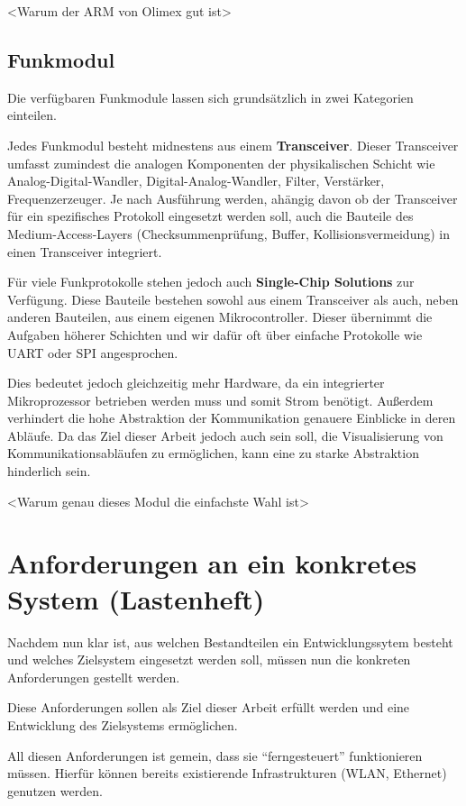 <Warum der ARM von Olimex gut ist>

\subsection{Funkmodul} Die verfügbaren Funkmodule lassen sich grundsätzlich in
zwei Kategorien einteilen.

Jedes Funkmodul besteht midnestens aus einem \textbf{Transceiver}. Dieser
Transceiver umfasst zumindest die analogen Komponenten der physikalischen
Schicht wie Analog-Digital-Wandler, Digital-Analog-Wandler, Filter, Verstärker,
Frequenzerzeuger. Je nach Ausführung werden, ahängig davon ob der Transceiver
für ein spezifisches Protokoll eingesetzt werden soll, auch die Bauteile des
Medium-Access-Layers (Checksummenprüfung, Buffer, Kollisionsvermeidung) in
einen Transceiver integriert.

Für viele Funkprotokolle stehen jedoch auch \textbf{Single-Chip Solutions}
zur Verfügung. Diese Bauteile bestehen sowohl aus einem Transceiver als auch,
neben anderen Bauteilen, aus einem eigenen Mikrocontroller. Dieser übernimmt die
Aufgaben höherer Schichten und wir dafür oft über einfache Protokolle wie UART
oder SPI angesprochen.

Dies bedeutet jedoch gleichzeitig mehr Hardware, da ein integrierter
Mikroprozessor betrieben werden muss und somit Strom benötigt.
Außerdem verhindert die hohe Abstraktion der Kommunikation genauere Einblicke in
deren Abläufe. Da das Ziel dieser Arbeit jedoch auch sein soll, die
Visualisierung von Kommunikationsabläufen zu ermöglichen, kann eine zu starke
Abstraktion hinderlich sein.


 <Warum genau dieses Modul die einfachste Wahl ist>
\section{Anforderungen an ein konkretes System (Lastenheft)}
Nachdem nun klar ist, aus welchen Bestandteilen ein Entwicklungssytem besteht
und welches Zielsystem eingesetzt werden soll, müssen nun die
konkreten Anforderungen gestellt werden.

Diese Anforderungen sollen als Ziel dieser Arbeit erfüllt werden und eine
Entwicklung des Zielsystems ermöglichen.

All diesen Anforderungen ist gemein, dass sie "`ferngesteuert"' funktionieren
müssen. Hierfür können bereits existierende Infrastrukturen (WLAN,
Ethernet) genutzen werden.

